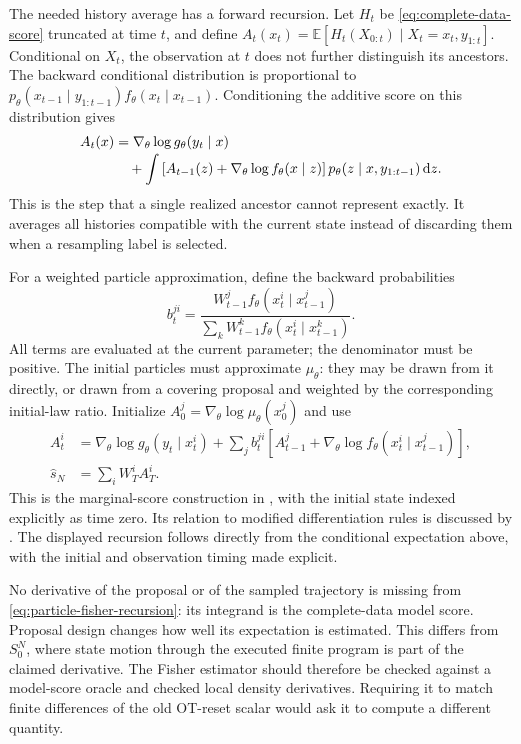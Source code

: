 \documentclass[11pt]{article}
\newcommand{\dd}{\mathrm{d}}
\begin{document}
The needed history average has a forward recursion. Let $H_t$ be
\eqref{eq:complete-data-score} truncated at time $t$, and define
$A_t(x_t)=\mathbb E[H_t(X_{0:t})\mid X_t=x_t,y_{1:t}]$. Conditional on
$X_t$, the observation at $t$ does not further distinguish its ancestors.
The backward conditional distribution is proportional to
$p_\theta(x_{t-1}\mid y_{1:t-1})f_\theta(x_t\mid x_{t-1})$.
Conditioning the additive score on this distribution gives
\begin{align}
 A_t(x)&=\nabla_\theta\log g_\theta(y_t\mid x)
 \notag\\[-2pt]
 &\quad+\int\left[A_{t-1}(z)
           +\nabla_\theta\log f_\theta(x\mid z)\right]
       p_\theta(z\mid x,y_{1:t-1})\,\dd z.
 \label{eq:fisher-conditional-recursion}
\end{align}
This is the step that a single realized ancestor cannot represent exactly.
It averages all histories compatible with the current state instead of
discarding them when a resampling label is selected.

For a weighted particle approximation, define the backward probabilities
\begin{equation}
 b_t^{ji}=
 \frac{W_{t-1}^j f_\theta(x_t^i\mid x_{t-1}^j)}
      {\sum_kW_{t-1}^k f_\theta(x_t^i\mid x_{t-1}^k)}.
 \label{eq:backward-particle-probabilities}
\end{equation}
All terms are evaluated at the current parameter; the denominator must be
positive. The initial particles must approximate $\mu_\theta$: they may be
drawn from it directly, or drawn from a covering proposal and weighted by
the corresponding initial-law ratio. Initialize
$A_0^j=\nabla_\theta\log\mu_\theta(x_0^j)$ and use
\begin{align}
 A_t^i&=\nabla_\theta\log g_\theta(y_t\mid x_t^i)
       +\sum_j b_t^{ji}\left[A_{t-1}^j
          +\nabla_\theta\log f_\theta(x_t^i\mid x_{t-1}^j)\right],\\
 \widehat s_N&=\sum_i W_T^i A_T^i.
 \label{eq:particle-fisher-recursion}
\end{align}
This is the marginal-score construction in
\citet[Section 2.2, Algorithm 2, equations (20) and (22)]{poyiadjis2011particle},
with the initial state indexed explicitly as time zero. Its relation to
modified differentiation rules is discussed by
\citet[Section 4.2, equations (24)--(25)]{scibior2021dpf}. The displayed
recursion follows directly from the conditional expectation above, with the
initial and observation timing made explicit.

No derivative of the proposal or of the sampled trajectory is missing from
\eqref{eq:particle-fisher-recursion}: its integrand is the complete-data
model score. Proposal design changes how well its expectation is estimated.
This differs from $S_0^N$, where state motion through the executed finite
program is part of the claimed derivative. The Fisher estimator should
therefore be checked against a model-score oracle and checked local density
derivatives. Requiring it to match finite differences of the old OT-reset
scalar would ask it to compute a different quantity.
\end{document}
